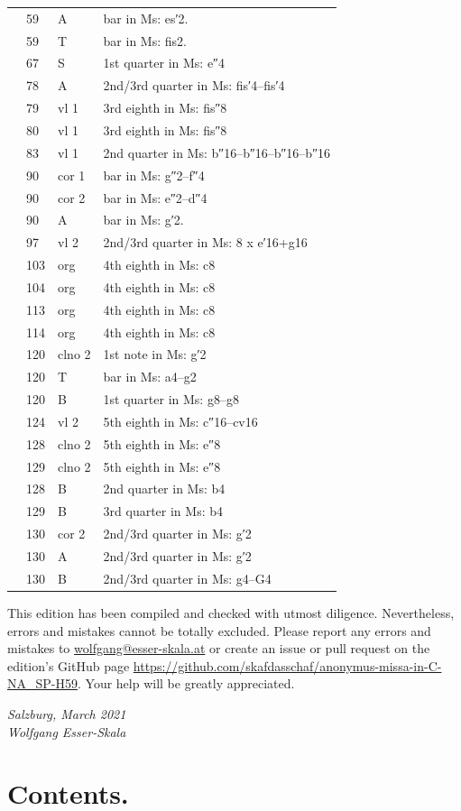 \documentclass[parskip=full]{scrreprt}
\newif\iftemplate\templatetrue
\begin{document}
\begin{longtable}{lll L{10cm}}
	  & 59   & A       & bar in Ms: es′2. \\
	  & 59   & T       & bar in Ms: fis2. \\
	  & 67   & S        &1st quarter in Ms: e″4 \\
	  & 78   & A       & 2nd/3rd quarter in Ms: fis′4–fis′4 \\
	  & 79   & vl 1    & 3rd eighth in Ms: fis″8 \\
	  & 80   & vl 1    & 3rd eighth in Ms: fis″8 \\
	  & 83   & vl 1    & 2nd quarter in Ms: b″16–b″16–b″16–b″16 \\
	  & 90   & cor 1   & bar in Ms: g″2–f″4 \\
	  & 90   & cor 2   & bar in Ms: e″2–d″4 \\
	  & 90   & A       & bar in Ms: g′2. \\
	  & 97   & vl 2    & 2nd/3rd quarter in Ms: 8 x e′16+g16 \\
	  & 103  & org     & 4th eighth in Ms: c8 \\
	  & 104  & org     & 4th eighth in Ms: c8 \\
	  & 113  & org     & 4th eighth in Ms: c8 \\
	  & 114  & org     & 4th eighth in Ms: c8 \\
	  & 120  & clno 2  & 1st note in Ms: g′2 \\
	  & 120  & T       & bar in Ms: a4–g2 \\
	  & 120  & B       & 1st quarter in Ms: g8–g8 \\
	  & 124  & vl 2    & 5th eighth in Ms: c″16–cv16 \\
	  & 128  & clno 2  & 5th eighth in Ms: e″8 \\
	  & 129  & clno 2  & 5th eighth in Ms: e″8 \\
	  & 128  & B       & 2nd quarter in Ms: b4 \\
	  & 129  & B       & 3rd quarter in Ms: b4 \\
	  & 130  & cor 2   & 2nd/3rd quarter in Ms: g′2 \\
	  & 130  & A       & 2nd/3rd quarter in Ms: g′2 \\
	  & 130  & B       & 2nd/3rd quarter in Ms: g4–G4 \\
	\bottomrule
\end{longtable}


This edition has been compiled and checked with utmost diligence. Nevertheless, errors and mistakes cannot be totally excluded. Please report any errors and mistakes to \url{wolfgang@esser-skala.at} or create an issue or pull request on the edition’s GitHub page \url{https://github.com/skafdasschaf/anonymus-missa-in-C-NA_SP-H59}. Your help will be greatly appreciated.

\bigskip
\textit{Salzburg, March 2021\\
Wolfgang Esser-Skala}

\cleardoublepage
\chapter*{Contents.}




\cleardoublepage
\fi

\iftemplate

\fi
\end{document}
